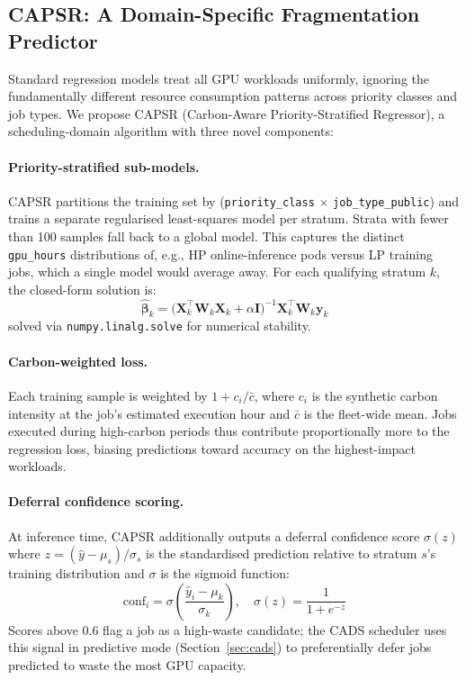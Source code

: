 \subsection{CAPSR: A Domain-Specific Fragmentation Predictor}
\label{sec:capsr}

Standard regression models treat all GPU workloads uniformly, ignoring the
fundamentally different resource consumption patterns across priority classes
and job types.  We propose CAPSR (Carbon-Aware Priority-Stratified Regressor),
a scheduling-domain algorithm with three novel components:

\paragraph{Priority-stratified sub-models.}
CAPSR partitions the training set by (\texttt{priority\_class}
$\times$ \texttt{job\_type\_public}) and trains a separate regularised
least-squares model per stratum.  Strata with fewer than 100 samples fall back
to a global model.  This captures the distinct \texttt{gpu\_hours} distributions
of, e.g., HP online-inference pods versus LP training jobs, which a single model
would average away.  For each qualifying stratum $k$, the closed-form solution is:
\begin{equation}
  \hat{\boldsymbol{\beta}}_k
    = \bigl(\mathbf{X}_k^\top \mathbf{W}_k \mathbf{X}_k
             + \alpha \mathbf{I}\bigr)^{-1}
      \mathbf{X}_k^\top \mathbf{W}_k \mathbf{y}_k
  \label{eq:ridge}
\end{equation}
solved via \texttt{numpy.linalg.solve} for numerical stability.

\paragraph{Carbon-weighted loss.}
Each training sample is weighted by $1 + c_i / \bar{c}$, where $c_i$ is the
synthetic carbon intensity at the job's estimated execution hour and $\bar{c}$
is the fleet-wide mean.  Jobs executed during high-carbon periods thus contribute
proportionally more to the regression loss, biasing predictions toward accuracy
on the highest-impact workloads.

\paragraph{Deferral confidence scoring.}
At inference time, CAPSR additionally outputs a deferral confidence score
$\sigma(z)$ where $z = (\hat{y} - \mu_s)/\sigma_s$ is the standardised
prediction relative to stratum $s$'s training distribution and $\sigma$ is the
sigmoid function:
\begin{equation}
  \text{conf}_i = \sigma\!\left(\frac{\hat{y}_i - \mu_k}{\sigma_k}\right),
  \quad \sigma(z) = \frac{1}{1+e^{-z}}
  \label{eq:conf}
\end{equation}
Scores above 0.6 flag a job as a high-waste candidate; the CADS scheduler uses
this signal in predictive mode (Section~\ref{sec:cads}) to preferentially defer
jobs predicted to waste the most GPU capacity.

